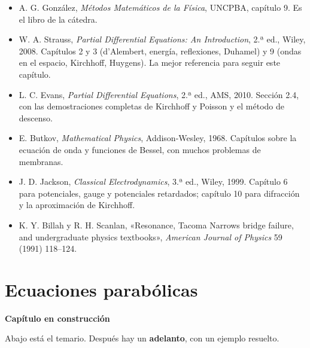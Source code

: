 \documentclass[
  spanish,
  a4paper,
]{scrbook}
\providecommand{\tightlist}{%
  \setlength{\itemsep}{0pt}\setlength{\parskip}{0pt}}
\theoremstyle{definition}
\theoremstyle{plain}
\theoremstyle{definition}
\theoremstyle{plain}
\theoremstyle{definition}
\theoremstyle{remark}
\begin{document}
\begin{itemize}
\tightlist
\item
  A. G. González, \emph{Métodos Matemáticos de la Física}, UNCPBA,
  capítulo 9. Es el libro de la cátedra.
\item
  W. A. Strauss, \emph{Partial Differential Equations: An Introduction},
  2.ª ed., Wiley, 2008. Capítulos 2 y 3 (d'Alembert, energía,
  reflexiones, Duhamel) y 9 (ondas en el espacio, Kirchhoff, Huygens).
  La mejor referencia para seguir este capítulo.
\item
  L. C. Evans, \emph{Partial Differential Equations}, 2.ª ed., AMS,
  2010. Sección 2.4, con las demostraciones completas de Kirchhoff y
  Poisson y el método de descenso.
\item
  E. Butkov, \emph{Mathematical Physics}, Addison-Wesley, 1968.
  Capítulos sobre la ecuación de onda y funciones de Bessel, con muchos
  problemas de membranas.
\item
  J. D. Jackson, \emph{Classical Electrodynamics}, 3.ª ed., Wiley, 1999.
  Capítulo 6 para potenciales, gauge y potenciales retardados; capítulo
  10 para difracción y la aproximación de Kirchhoff.
\item
  K. Y. Billah y R. H. Scanlan, «Resonance, Tacoma Narrows bridge
  failure, and undergraduate physics textbooks», \emph{American Journal
  of Physics} 59 (1991) 118--124.
\end{itemize}

\chapter{Ecuaciones parabólicas}\label{sec-parabolicas}

\begin{tcolorbox}[enhanced jigsaw, arc=.35mm, bottomrule=.15mm, breakable, colback=white, colframe=quarto-callout-note-color-frame, left=2mm, leftrule=.75mm, opacityback=0, rightrule=.15mm, toprule=.15mm]
\begin{minipage}[t]{5.5mm}
\textcolor{quarto-callout-note-color}{\faInfo}
\end{minipage}%
\begin{minipage}[t]{\textwidth - 5.5mm}

\vspace{-3mm}\textbf{Capítulo en construcción}\vspace{3mm}

Abajo está el temario. Después hay un \textbf{adelanto}, con un ejemplo
resuelto.

\end{minipage}%
\end{tcolorbox}
\end{document}
